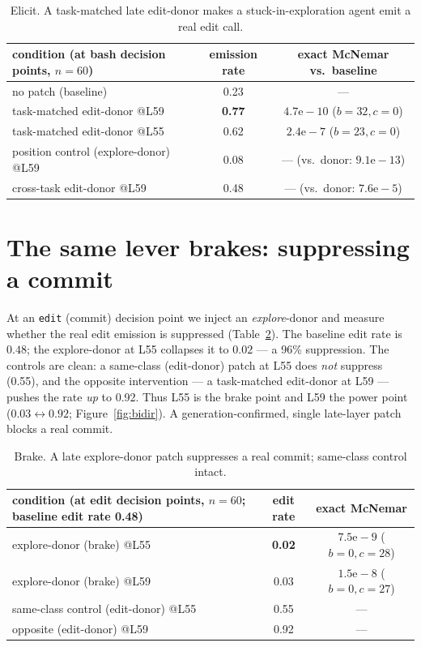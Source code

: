 \documentclass[11pt]{article}
\begin{document}
\begin{table}[h]\centering\small
\begin{tabular}{lcc}
\toprule
condition (at bash decision points, $n{=}60$) & emission rate & exact McNemar vs.\ baseline \\
\midrule
no patch (baseline) & 0.23 & --- \\
task-matched edit-donor @L59 & \textbf{0.77} & $4.7\mathrm{e}{-}10$ ($b{=}32,c{=}0$) \\
task-matched edit-donor @L55 & 0.62 & $2.4\mathrm{e}{-}7$ ($b{=}23,c{=}0$) \\
position control (explore-donor) @L59 & 0.08 & --- (vs.\ donor: $9.1\mathrm{e}{-}13$) \\
cross-task edit-donor @L59 & 0.48 & --- (vs.\ donor: $7.6\mathrm{e}{-}5$) \\
\bottomrule
\end{tabular}
\caption{Elicit. A task-matched late edit-donor makes a stuck-in-exploration agent emit a real edit call.}
\label{tab:h1}
\end{table}

\section{The same lever brakes: suppressing a commit}\label{sec:brake}
At an \texttt{edit} (commit) decision point we inject an \emph{explore}-donor and measure whether the real edit
emission is suppressed (Table~\ref{tab:h2}). The baseline edit rate is $0.48$; the explore-donor at L55
collapses it to $0.02$ --- a 96\% suppression. The controls are clean: a same-class (edit-donor) patch at L55
does \emph{not} suppress (0.55), and the opposite intervention --- a task-matched edit-donor at L59 --- pushes
the rate \emph{up} to 0.92. Thus L55 is the brake point and L59 the power point ($0.03 \leftrightarrow 0.92$; Figure~\ref{fig:bidir}). A
generation-confirmed, single late-layer patch blocks a real commit.

\begin{table}[h]\centering\small
\begin{tabular}{lcc}
\toprule
condition (at edit decision points, $n{=}60$; baseline edit rate 0.48) & edit rate & exact McNemar \\
\midrule
explore-donor (brake) @L55 & \textbf{0.02} & $7.5\mathrm{e}{-}9$ ($b{=}0,c{=}28$) \\
explore-donor (brake) @L59 & 0.03 & $1.5\mathrm{e}{-}8$ ($b{=}0,c{=}27$) \\
same-class control (edit-donor) @L55 & 0.55 & --- \\
opposite (edit-donor) @L59 & 0.92 & --- \\
\bottomrule
\end{tabular}
\caption{Brake. A late explore-donor patch suppresses a real commit; same-class control intact.}
\label{tab:h2}
\end{table}
\end{document}
